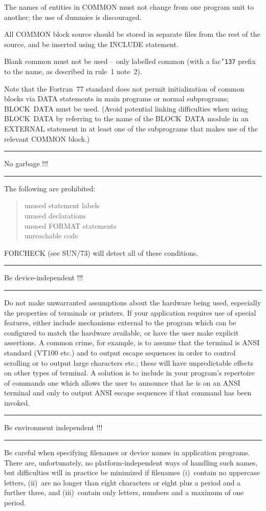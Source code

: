 \documentclass[twoside,11pt]{article}
\newcounter{sruleno}
\newcommand{\srule}[1]{
    \addtocounter{sruleno}{1}
    \goodbreak
    \rule[0.5ex]{\textwidth}{0.3mm}
    {\Large #1 \hfill {\thesruleno}}
    \rule[0.5ex]{\textwidth}{0.1mm}
}
\newcommand{\srule}[1]{
       \addtocounter{sruleno}{1}
       \begin{rawhtml} <HR> \end{rawhtml}
       {\Large \thesruleno}~~~~{\Large #1}
       \begin{rawhtml} <HR> \end{rawhtml}
       \end{tabular}
  }
\renewcommand{\_}{{\tt\char'137}}
\begin{document}
The names of entities in COMMON must not change from one program unit to
another; the use of dummies is discouraged.

All COMMON block source should be stored in separate files from the rest of the
source, and be inserted using the INCLUDE statement.

Blank common must not be used -- only labelled common (with a fac\_ prefix to
the name, as described in rule~1 note~2).

Note that the Fortran~77 standard does not permit initialization of common
blocks via DATA statements in main programs or normal subprograms;
BLOCK~DATA must be used.  (Avoid potential linking difficulties
when using BLOCK~DATA by referring to the name of the BLOCK~DATA module in an
EXTERNAL statement in at least one of the subprograms that makes use of
the relevant COMMON block.)

\srule{No garbage !!!}
The following are prohibited:
\begin{quote}
\begin{tabbing}
unused statement labels\\
unused declarations\\
unused FORMAT statements\\
unreachable code\\
\end{tabbing}
\end{quote}
FORCHECK (see SUN/73) will detect all of these conditions.

\srule{Be device-independent !!!}
Do not make unwarranted assumptions about the
hardware being used, especially the properties of
terminals or printers.  If your application requires
use of special features, either include mechanisms
external to the program which can be configured to
match the hardware available, or have the user make
explicit assertions.  A common crime, for example, is
to assume that the terminal is ANSI standard (VT100 etc.)
and to output escape sequences in order to control
scrolling or to output large characters etc.; these
will have unpredictable effects on other types of
terminal.  A solution is to include
in your program's repertoire of commands one which allows
the user to announce that he is on an ANSI terminal and
only to output ANSI escape sequences if that
command has been invoked.

\srule{Be environment independent !!!}
Be careful when specifying filenames or device names in application
programs.  There are, unfortunately, no platform-independent ways
of handling such names, but difficulties will in practice
be minimized if
filenames (i)~contain no uppercase letters, (ii)~are no longer than
eight characters or eight plus a period and a further three,
and (iii)~contain only letters, numbers and a maximum of
one period.
\end{document}
